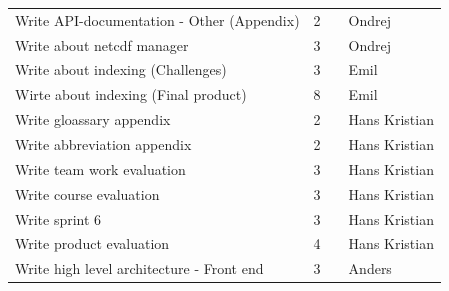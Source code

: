 \documentclass[11pt,a4paper,titlepage,oneside]{report}
\begin{document}
\begin{table}[h]
{\begin{tabular}{llll}
Write API-documentation - Other (Appendix)             & 2                                                                   &                                                         & Ondrej                     \\
Write about \gls{netcdf} manager                             & 3                                                                   &                                                         & Ondrej                     \\
Write about indexing (Challenges)                      & 3                                                                   &                                                         & Emil                       \\
Wirte about indexing (Final product)                   & 8                                                                   &                                                         & Emil                       \\
Write gloassary appendix                               & 2                                                                   &                                                         & Hans Kristian              \\
Write abbreviation appendix                            & 2                                                                   &                                                         & Hans Kristian              \\
Write team work evaluation                             & 3                                                                   &                                                         & Hans Kristian              \\
Write course evaluation                                & 3                                                                   &                                                         & Hans Kristian              \\
Write sprint 6                                         & 3                                                                   &                                                         & Hans Kristian              \\
Write product evaluation                               & 4                                                                   &                                                         & Hans Kristian              \\
Write high level architecture - Front end              & 3                                                                   &                                                         & Anders                     \\

\end{tabular}}
\end{table}
\end{document}
